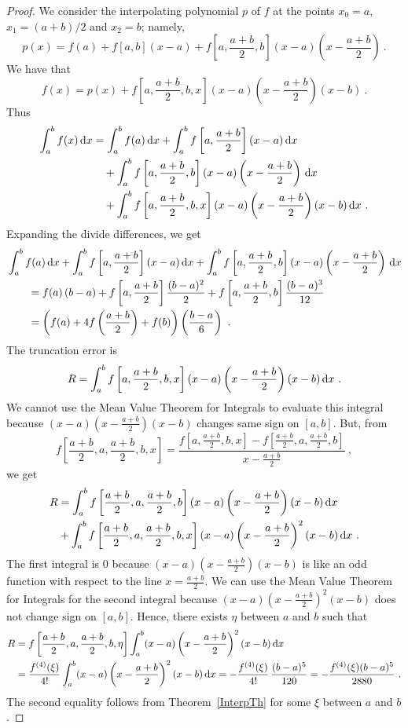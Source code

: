 \begin{proof}
We consider the interpolating polynomial $p$ of $f$ at
the points $x_0=a$, $x_1=(a+b)/2$ and $x_2=b$; namely,
\[
p(x) =f(a) + f[a,b](x-a)
+f\left[a,\frac{a+b}{2},b\right](x-a)\left(x-\frac{a+b}{2}\right) \ .
\]
We have that
\[
f(x) = p(x)+f\left[a,\frac{a+b}{2},b,x\right]
(x-a)\left(x-\frac{a+b}{2}\right)(x-b) \ .
\]
Thus
\begin{align*}
\int_a^b  f(x) \,\mathrm{d}x  &= \int_a^b f(a) \,\mathrm{d}x +
\int_a^b f\left[a,\frac{a+b}{2}\right](x-a)\,\mathrm{d}x \\
&\quad + \int_a^b f\left[a,\frac{a+b}{2},b\right]
(x-a)\left(x-\frac{a+b}{2}\right)\,\mathrm{d}x \\
&\quad + \int_a^b f\left[a,\frac{a+b}{2},b,x\right]
(x-a)\left(x-\frac{a+b}{2}\right)(x-b)\,\mathrm{d}x \ .
\end{align*}
Expanding the divide differences, we get
\begin{align*}
&\int_a^b f(a) \,\mathrm{d}x
+\int_a^b f\left[a,\frac{a+b}{2}\right](x-a)\,\mathrm{d}x +
\int_a^b f\left[a,\frac{a+b}{2},b\right]
(x-a)\left(x-\frac{a+b}{2}\right)\,\mathrm{d}x \\
&\qquad = f(a)\,(b-a) + f\left[a,\frac{a+b}{2}\right]\frac{(b-a)^2}{2} +
f\left[a,\frac{a+b}{2},b\right]\frac{(b-a)^3}{12} \\
&\qquad = \left(f(a) + 4f\left(\frac{a+b}{2}\right) + f(b) \right)
\left(\frac{b-a}{6}\right) \ .
\end{align*}
The truncation error is
\[
R = \int_a^b f\left[a,\frac{a+b}{2},b,x\right]
(x-a)\left(x-\frac{a+b}{2}\right)(x-b)\,\mathrm{d}x \ .
\]
We cannot use the Mean Value Theorem for Integrals to
evaluate this integral because
$\displaystyle (x-a)\left(x-\frac{a+b}{2}\right)(x-b)$ changes
same sign on $[a,b]$.  But, from
\[
f\left[\frac{a+b}{2},a,\frac{a+b}{2},b,x\right] =
\frac{\displaystyle f\left[a,\frac{a+b}{2},b,x\right] -
f\left[\frac{a+b}{2},a,\frac{a+b}{2},b\right]}
{\displaystyle x - \frac{a+b}{2}} \ ,
\]
we get
\begin{align*}
R &= \int_a^b f\left[\frac{a+b}{2},a,\frac{a+b}{2},b\right]
(x-a)\left(x-\frac{a+b}{2}\right)(x-b)\,\mathrm{d}x \\
 &+ \int_a^b f\left[\frac{a+b}{2},a,\frac{a+b}{2},b,x\right]
(x-a)\left(x-\frac{a+b}{2}\right)^2(x-b)\,\mathrm{d}x \ .
\end{align*}
The first integral is $0$ because
$\displaystyle (x-a)\left(x-\frac{a+b}{2}\right)(x-b)$ is like an odd
function with respect to the line $\displaystyle x= \frac{a+b}{2}$.  We can
use the Mean Value Theorem for Integrals for the second
integral because
$\displaystyle (x-a)\left(x-\frac{a+b}{2}\right)^2(x-b)$ does not
change sign on $[a,b]$.  Hence, there exists $\eta$ between $a$ and $b$
such that
\begin{align*}
R &= f\left[\frac{a+b}{2},a,\frac{a+b}{2},b,\eta\right]
\int_a^b (x-a)\left(x-\frac{a+b}{2}\right)^2(x-b)\,\mathrm{d}x \\
&= \frac{f^{(4)}(\xi)}{4!}
\int_a^b (x-a)\left(x-\frac{a+b}{2}\right)^2(x-b)\,\mathrm{d}x
= -\frac{f^{(4)}(\xi)}{4!}\,\frac{(b-a)^5}{120}
= -\frac{f^{(4)}(\xi)(b-a)^5}{2880} \ .
\end{align*}
The second equality follows from Theorem~\ref{InterpTh} for some
$\xi$ between $a$ and $b$.
\end{proof}


